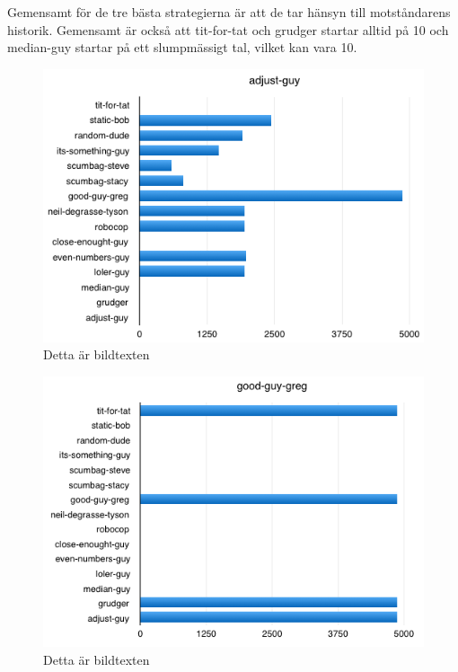 Gemensamt för de tre bästa strategierna är att de tar hänsyn till motståndarens historik. Gemensamt är också att tit-for-tat och grudger startar alltid på 10 och median-guy startar på ett slumpmässigt tal, vilket kan vara 10. 

\begin{figure}[htb]
	\begin{center}
	\includegraphics[scale=0.75, angle=0]{bilder/adjust-guy.png}
	\caption{Detta är bildtexten}
	\label{adjust-guy}
	\end{center}
\end{figure}

\begin{figure}[htb]
	\begin{center}
	\includegraphics[scale=0.75, angle=0]{bilder/good-guy-greg.png}
	\caption{Detta är bildtexten}
	\label{good-guy-greg}
	\end{center}
\end{figure}

